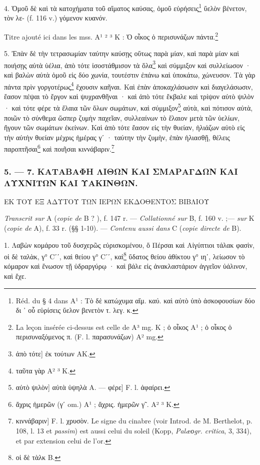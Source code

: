 \documentclass[a4paper, 11pt, oneside, polutonikogreek, french]{article}
\begin{document}
4. Ὁμοῦ δὲ καὶ τὰ κατοχήματα τοῦ αἵματος καύσας, ὁμοῦ εὑρήσεις\footnote{Réd. du § 4 dans A¹ : Τὸ δὲ κατώχυμα αἵμ. καύ. καὶ αὐτὸ ὑπὸ ἀσκοφουσίων δύο δι ᾽ οὗ εὑρίσεις ὕελον βενετὸν τ. λεγ. κ.} ὕελὸν βένετον, τὸν λε- (f. 116 v.) γόμενον κυανόν.

Titre ajouté ici dans les mss. A¹ ² ³ K : Ὁ οἶκος ὁ περισυνάζων πάντα.\footnote{La leçon insérée ci-dessus est celle de A³ mg. K ; ὁ οἶκος A¹ ; ὁ οἶκος ὁ περισυναξόμενος π. (F. l. παρασυνάζων) A² mg.}

5. Ἐπὰν δὲ τὴν τετρασωμίαν ταύτην καύσῃς οὕτως παρὰ μίαν, καὶ παρὰ μίαν καὶ ποιήσῃς αὐτὰ ὑέλια, ἀπὸ τότε ἰσοστάθμισον τὰ ὅλα\footnote{ἀπὸ τότε] ἐκ τούτων AK.} καὶ σύμμιξον καὶ συλλείωσον · καὶ βαλὼν αὐτὰ ὁμοῦ εἰς δύο χωνία, τουτέστιν ἐπάνω καὶ ὑποκάτω, χώνευσον. Τὰ γὰρ πάντα πρὶν γοργοτέρως\footnote{ταῦτα γὰρ A² ³ K.} ἔχουσιν καῆναι. Καὶ ἐπὰν ἀποκαχλάσωσιν καὶ διαγελάσωσιν, ἔασον πέψαι τὸ ἔργον καὶ ψυχρανθῆναι · καὶ ἀπὸ τότε ἔκβαλε καὶ τρίψον αὐτὸ ψιλὸν · καὶ τότε φέρε τὰ ἔλαια τῶν ὅλων σωμάτων, καὶ σύμμιξον\footnote{αὐτὸ ψιλὸν] αὐτὰ ὑψηλὰ A. --- φέρε] F. l. ἀφαίρει.} αὐτὰ, καὶ πότισον αὐτὰ, ποιῶν τὸ σύνθεμα ὥσπερ ζυμὴν παχεῖαν, συλλεαίνων τὸ ἔλαιον μετὰ τῶν ὑελίων, ἤγουν τῶν σωμάτων ἐκείνων. Καὶ ἀπὸ τότε ἔασον εἰς τὴν θυείαν, ἡλιάζων αὐτὸ εἰς τὴν αὐτὴν θυείαν μέχρις ἡμέρας γʹ · ταύτην τὴν ζυμὴν, ἐπὰν ἡλιασθῇ, θέλεις παροπτῆσαι\footnote{ἄχρις ἡμερῶν (γʹ om.) A¹ ; ἄχρις. ἡμερῶν γ῀. A² ³ K.} καὶ ποιῆσαι κιννάβαριν.\footnote{κιννάβαριν] F. l. χρυσὸν. Le signe du cinabre (voir Introd. de M. Berthelot, p. 108, l. 13 et \emph{passim}) est aussi celui du soleil (Kopp, \emph{Palæοgr. critica}, 3, 334), et par extension celui de l'or.}

\bigskip
\centerline{\EightStarTaper}
\centerline{\EightStarTaper\EightStarTaper}
\bigskip

\subsubsection{5. --- 7. ΚΑΤΑΒΑΦΗ ΛΙΘΩΝ ΚΑΙ ΣΜΑΡΑΓΔΩΝ ΚΑΙ ΛΥΧΝΙΤΩΝ ΚΑΙ ΥΑΚΙΝΘΩΝ.}

ΕΚ ΤΟΥ ΕΞ ΑΔΥΤΟΥ ΤΩΝ ΙΕΡΩΝ ΕΚΔΟΘΕΝΤΟΣ ΒΙΒΛΙΟΥ

\emph{Transcrit sur} A (\emph{copie de} B ? ), f. 147 r. --- \emph{Collationné sur} B, f. 160 v. ;--- \emph{sur} K (\emph{copie de} A), f. 33 r. (§§ 1-10). --- \emph{Contenu aussi dans} C (\emph{copie directe de} B).

1. Λαβὼν κομάρου τοῦ δυσχερῶς εὑρισκομένου, ὅ Πέρσαι καὶ Αἰγύπτιοι τάλακ φασὶν, οἱ δὲ ταλὰκ, γ° Cʹʹ, καὶ θείου γ° Cʹʹ, καὶ\footnote{οἱ δὲ τὰλκ B.} ὕδατος θείου ἀθίκτου γ° ιηʹ, λείωσον τὸ κόμαρον καὶ ἕνωσον τῇ ὑδραργύρῳ · καὶ βάλε εἰς ἀνακλαστάριον ἀγγεῖον ὑάλινον, καὶ ἔχε.
\end{document}
